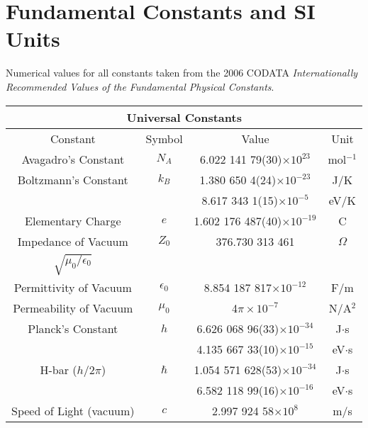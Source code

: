 \chapter{Fundamental Constants and SI Units}
Numerical values for all constants taken from the 2006 CODATA
\textit{Internationally Recommended Values of the Fundamental Physical
  Constants}.\\
\hspace{1cm}

\begin{table}[!h]
  \centering
  \begin{tabular}{c c c c}
    \multicolumn{4}{c}{\Large Universal Constants}\\
    \hline
    Constant \T\B& Symbol & Value & Unit \\ [0.5ex]
    \hline\hline
    Avagadro's Constant \T  & $N_A$        & 6.022 141 79(30)$\times10^{23}$ & mol$^{-1}$ \\[4pt]

    Boltzmann's Constant    & $k_B$        & 1.380 650 4(24)$\times10^{-23}$ &  J/K \\
                            &              & 8.617 343 1(15)$\times10^{-5}$  & eV/K \\[4pt]

    Elementary Charge       & $e$          & 1.602 176 487(40)$\times10^{-19}$ & C \\[4pt]

    Impedance of Vacuum    & $Z_0$        & 376.730 313 461 & $\Omega$ \\
    $\sqrt{\mu_0/\epsilon_0}$ & & &\\[4pt]

    Permittivity of Vacuum  & $\epsilon_0$ & 8.854 187 817$\times10^{-12}$ & F/m \\[4pt]

    Permeability of Vacuum  & $\mu_0$      & 4$\pi\times10^{-7}$         & N/A$^2$ \\[4pt]

    Planck's Constant       & $h$          & 6.626 068 96(33)$\times10^{-34}$ & J$\cdot$s \\
                            &              & 4.135 667 33(10)$\times10^{-15}$ & eV$\cdot$s \\[4pt]

    H-bar ($h/2\pi$)        & $\hbar$      & 1.054 571 628(53)$\times10^{-34}$ & J$\cdot$s \\
                            &              & 6.582 118 99(16)$\times10^{-16}$ & eV$\cdot$s \\[4pt]

    Speed of Light (vacuum)\B & $c$          & 2.997 924 58$\times10^8$ & m/s \\[4pt]
    \hline
  \end{tabular}
  \label{Table:univConst}
\end{table}
